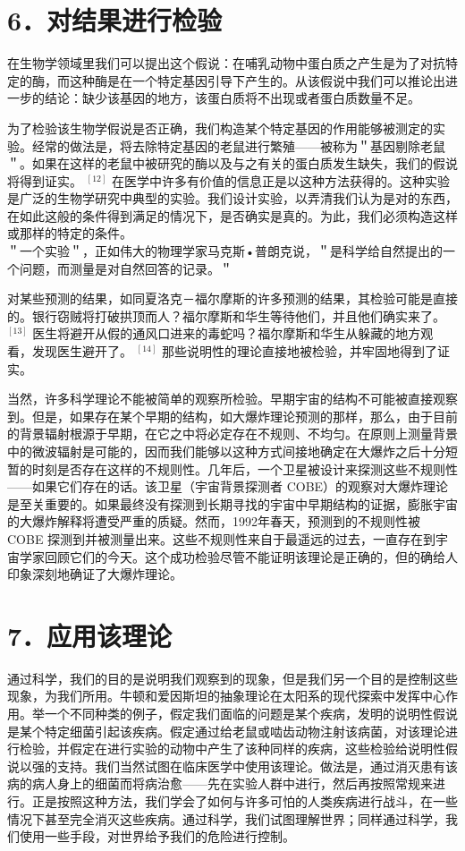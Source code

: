 \section*{6．对结果进行检验}
在生物学领域里我们可以提出这个假说：在哺乳动物中蛋白质之产生是为了对抗特定的酶，而这种酶是在一个特定基因引导下产生的。从该假说中我们可以推论出进一步的结论：缺少该基因的地方，该蛋白质将不出现或者蛋白质数量不足。

为了检验该生物学假说是否正确，我们构造某个特定基因的作用能够被测定的实验。经常的做法是，将去除特定基因的老鼠进行繁殖——被称为＂基因剔除老鼠＂。如果在这样的老鼠中被研究的酶以及与之有关的蛋白质发生缺失，我们的假说将得到证实。 ${ }^{[12]}$ 在医学中许多有价值的信息正是以这种方法获得的。这种实验是广泛的生物学研究中典型的实验。我们设计实验，以弄清我们认为是对的东西，在如此这般的条件得到满足的情况下，是否确实是真的。为此，我们必须构造这样或那样的特定的条件。\\
＂一个实验＂，正如伟大的物理学家马克斯•普朗克说，＂是科学给自然提出的一个问题，而测量是对自然回答的记录。＂

对某些预测的结果，如同夏洛克－福尔摩斯的许多预测的结果，其检验可能是直接的。银行窃贼将打破拱顶而人？福尔摩斯和华生等待他们，并且他们确实来了。 ${ }^{[13]}$ 医生将避开从假的通风口进来的毒蛇吗？福尔摩斯和华生从躲藏的地方观看，发现医生避开了。 ${ }^{[14]}$ 那些说明性的理论直接地被检验，并牢固地得到了证实。

当然，许多科学理论不能被简单的观察所检验。早期宇宙的结构不可能被直接观察到。但是，如果存在某个早期的结构，如大爆炸理论预测的那样，那么，由于目前的背景辐射根源于早期，在它之中将必定存在不规则、不均匀。在原则上测量背景中的微波辐射是可能的，因而我们能够以这种方式间接地确定在大爆炸之后十分短暂的时刻是否存在这样的不规则性。几年后，一个卫星被设计来探测这些不规则性——如果它们存在的话。该卫星（宇宙背景探测者 COBE）的观察对大爆炸理论是至关重要的。如果最终没有探测到长期寻找的宇宙中早期结构的证据，膨胀宇宙的大爆炸解释将遭受严重的质疑。然而，1992年春天，预测到的不规则性被 COBE 探测到并被测量出来。这些不规则性来自于最遥远的过去，一直存在到宇宙学家回顾它们的今天。这个成功检验尽管不能证明该理论是正确的，但的确给人印象深刻地确证了大爆炸理论。

\section*{7．应用该理论}
通过科学，我们的目的是说明我们观察到的现象，但是我们另一个目的是控制这些现象，为我们所用。牛顿和爱因斯坦的抽象理论在太阳系的现代探索中发挥中心作用。举一个不同种类的例子，假定我们面临的问题是某个疾病，发明的说明性假说是某个特定细菌引起该疾病。假定通过给老鼠或啮齿动物注射该病菌，对该理论进行检验，并假定在进行实验的动物中产生了该种同样的疾病，这些检验给说明性假说以强的支持。我们当然试图在临床医学中使用该理论。做法是，通过消灭患有该病的病人身上的细菌而将病治愈——先在实验人群中进行，然后再按照常规来进行。正是按照这种方法，我们学会了如何与许多可怕的人类疾病进行战斗，在一些情况下甚至完全消灭这些疾病。通过科学，我们试图理解世界；同样通过科学，我们使用一些手段，对世界给予我们的危险进行控制。

